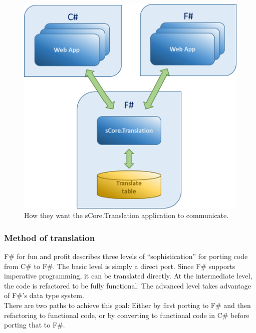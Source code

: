 \documentclass[12pt, a4paper]{article}
\begin{document}
\begin{figure}[!h]
    \includegraphics[scale=0.5]{image02}
    \centering
    \caption{How they want the sCore.Translation application to communicate.}
\end{figure}

\newpage
\subsubsection{Method of translation}
F\# for fun and profit describes three levels of “sophistication” for porting code from C\# to F\#. The basic level is simply a direct port. Since F\# supports imperative programming, it can be translated directly. At the intermediate level, the code is refactored to be fully functional. The advanced level takes advantage of F\#’s data type system.\\

There are two paths to achieve this goal: Either by first porting to F\# and then refactoring to functional code, or by converting to functional code in C\# before porting that to F\#.
\end{document}
